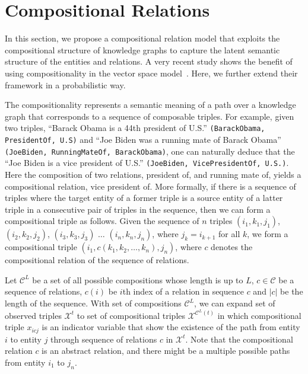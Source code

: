 \section{Compositional Relations}
\label{sec:comp}

In this section, we propose a compositional relation model that exploits the compositional structure of
knowledge graphs to capture the latent semantic structure of the entities and relations.
A very recent study shows the benefit of using compositionality in the vector space model~\cite{guu2015traversing}. Here, we further extend their framework in a probabilistic way.

The compositionality represents a semantic meaning of a path over a knowledge graph that corresponds to a
sequence of composable triples.
For example, given two triples, ``Barack Obama is a 44th president of U.S.'' \texttt{(BarackObama, PresidentOf,
U.S)} and ``Joe Biden was a running mate of Barack Obama'' \texttt{(JoeBiden, RunningMateOf, BarackObama)},
one can naturally deduce that the ``Joe Biden is a vice president of U.S.'' \texttt{(JoeBiden, VicePresidentOf, U.S.)}.
Here the composition of two relations, president of, and running mate of, yields a compositional relation,
vice president of.
More formally, if there is a sequence of triples where the target entity of a former triple is a source entity of a
latter triple in a consecutive pair of triples in the sequence, then we can form a compositional triple
as follows.
Given the sequence of $n$ triples
$(i_1, k_1 ,j_1)$,  $(i_2, k_2, j_2)$, $(i_3, k_3, j_3)$ $\dots$ $(i_n, k_n, j_n)$, where $j_{k}=i_{k+1}$ for all $k$,  we form a compositional triple $(i_1, {c}(k_1, k_2, \dots, k_n), j_n)$, where $c$ denotes the compositional
relation of the sequence of relations.

Let $\mathcal{C}^{L}$ be a set of all possible compositions whose length is up to $L$, $c \in \mathcal{C}$
be a sequence of relations, $c(i)$ be $i$th index of a relation in sequence $c$ and $|c|$ be the length of the
sequence. With set of compositions $\mathcal{C}^{L}$, we can expand set of observed triples
$\mathcal{X}^{t}$ to set of compositional triples $\mathcal{X}^{\mathcal{C}^{L}(t)}$ in which
compositional triple $x_{icj}$ is an
indicator variable that show the existence of the path from entity $i$ to entity $j$ through sequence
of relations
$c$ in $\mathcal{X}^{t}$. Note that the compositional relation $c$ is an abstract relation, and there might be a
multiple possible paths from entity $i_1$ to $j_n$.

